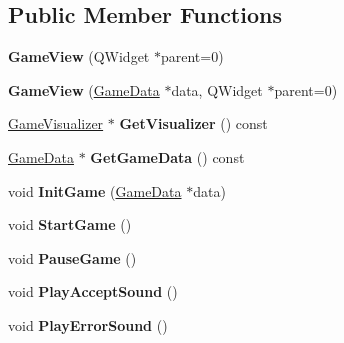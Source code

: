 \subsection*{Public Member Functions}
\begin{DoxyCompactItemize}
\item 
\hypertarget{classGameView_a6f41d09f51d2abd6abb3b99e5da8ef6f}{{\bfseries Game\-View} (Q\-Widget $\ast$parent=0)}\label{classGameView_a6f41d09f51d2abd6abb3b99e5da8ef6f}

\item 
\hypertarget{classGameView_ae2f4618068a746a97c33859a7550640e}{{\bfseries Game\-View} (\hyperlink{classGameData}{Game\-Data} $\ast$data, Q\-Widget $\ast$parent=0)}\label{classGameView_ae2f4618068a746a97c33859a7550640e}

\item 
\hypertarget{classGameView_aef16847b30bf78a6ecc0888ab1157c8b}{\hyperlink{classGameVisualizer}{Game\-Visualizer} $\ast$ {\bfseries Get\-Visualizer} () const }\label{classGameView_aef16847b30bf78a6ecc0888ab1157c8b}

\item 
\hypertarget{classGameView_a7372d6130ea98db65d8dffc0c4c6989e}{\hyperlink{classGameData}{Game\-Data} $\ast$ {\bfseries Get\-Game\-Data} () const }\label{classGameView_a7372d6130ea98db65d8dffc0c4c6989e}

\item 
\hypertarget{classGameView_a6ecf68723625fae0f3f6301040b166fe}{void {\bfseries Init\-Game} (\hyperlink{classGameData}{Game\-Data} $\ast$data)}\label{classGameView_a6ecf68723625fae0f3f6301040b166fe}

\item 
\hypertarget{classGameView_abd2ab0306c7ce339f7d2d994f21f9f7d}{void {\bfseries Start\-Game} ()}\label{classGameView_abd2ab0306c7ce339f7d2d994f21f9f7d}

\item 
\hypertarget{classGameView_a2b977bd2bd50b851438230f7c4a4ac93}{void {\bfseries Pause\-Game} ()}\label{classGameView_a2b977bd2bd50b851438230f7c4a4ac93}

\item 
\hypertarget{classGameView_a2a1634628f3c981462f54c6c1f18ec6d}{void {\bfseries Play\-Accept\-Sound} ()}\label{classGameView_a2a1634628f3c981462f54c6c1f18ec6d}

\item 
\hypertarget{classGameView_a0bc73aeff44e7e52bd1d73a21dd6a7f2}{void {\bfseries Play\-Error\-Sound} ()}\label{classGameView_a0bc73aeff44e7e52bd1d73a21dd6a7f2}


\end{DoxyCompactItemize}
